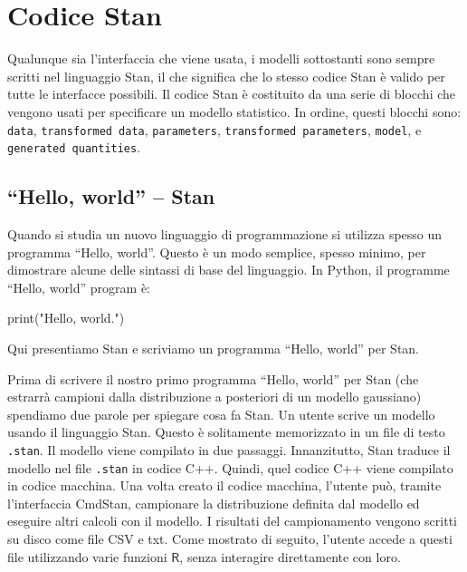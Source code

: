 \documentclass[
  11pt,
]{krantz}
\makeatletter
\newenvironment{Shaded}{\begin{snugshade}}{\end{snugshade}}
\newcommand{\BuiltInTok}[1]{#1}
\newcommand{\NormalTok}[1]{#1}
\newcommand{\StringTok}[1]{\textcolor[rgb]{0.5,0.5,0.5}{#1}}
\newenvironment{kframe}{%
\medskip{}
\setlength{\fboxsep}{.8em}
 \def\at@end@of@kframe{}%
 \ifinner\ifhmode%
  \def\at@end@of@kframe{\end{minipage}}%
  \begin{minipage}{\columnwidth}%
 \fi\fi%
 \def\FrameCommand##1{\hskip\@totalleftmargin \hskip-\fboxsep
 \colorbox{shadecolor}{##1}\hskip-\fboxsep
     \hskip-\linewidth \hskip-\@totalleftmargin \hskip\columnwidth}%
 \MakeFramed {\advance\hsize-\width
   \@totalleftmargin\z@ \linewidth\hsize
   \@setminipage}}%
 {\par\unskip\endMakeFramed%
 \at@end@of@kframe}
\renewenvironment{Shaded}{\begin{kframe}}{\end{kframe}}
\newcommand{\R}{\textsf{R}} %
\theoremstyle{definition}
\theoremstyle{definition}
\theoremstyle{definition}
\theoremstyle{definition}
\theoremstyle{remark}
\makeatother
\begin{document}
\hypertarget{codice-stan}{%
\section{Codice Stan}\label{codice-stan}}

Qualunque sia l'interfaccia che viene usata, i modelli sottostanti sono sempre scritti nel linguaggio Stan, il che significa che lo stesso codice Stan è valido per tutte le interfacce possibili. Il codice Stan è costituito da una serie di blocchi che vengono usati per specificare un modello statistico. In ordine, questi blocchi sono: \texttt{data}, \texttt{transformed\ data}, \texttt{parameters}, \texttt{transformed\ parameters}, \texttt{model}, e \texttt{generated\ quantities}.

\hypertarget{hello-world-stan}{%
\subsection{``Hello, world'' -- Stan}\label{hello-world-stan}}

Quando si studia un nuovo linguaggio di programmazione si utilizza spesso un programma ``Hello, world''. Questo è un modo semplice, spesso minimo, per dimostrare alcune delle sintassi di base del linguaggio. In Python, il programme ``Hello, world'' program è:

\begin{Shaded}
\begin{Highlighting}[]
\BuiltInTok{print}\NormalTok{(}\StringTok{"Hello, world."}\NormalTok{)}
\end{Highlighting}
\end{Shaded}

Qui presentiamo Stan e scriviamo un programma ``Hello, world'' per Stan.

Prima di scrivere il nostro primo programma ``Hello, world'' per Stan (che estrarrà campioni dalla distribuzione a posteriori di un modello gaussiano) spendiamo due parole per spiegare cosa fa Stan. Un utente scrive un modello usando il linguaggio Stan. Questo è solitamente memorizzato in un file di testo \texttt{.stan}. Il modello viene compilato in due passaggi. Innanzitutto, Stan traduce il modello nel file \texttt{.stan} in codice C++. Quindi, quel codice C++ viene compilato in codice macchina. Una volta creato il codice macchina, l'utente può, tramite l'interfaccia CmdStan, campionare la distribuzione definita dal modello ed eseguire altri calcoli con il modello. I risultati del campionamento vengono scritti su disco come file CSV e txt. Come mostrato di seguito, l'utente accede a questi file utilizzando varie funzioni \(\R\), senza interagire direttamente con loro.
\end{document}
